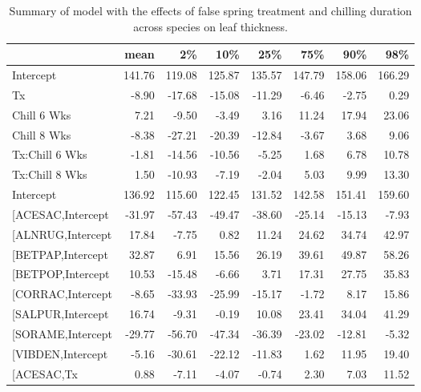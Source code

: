 \documentclass{article}\usepackage[]{graphicx}\usepackage[]{color}
\makeatletter
\newenvironment{kframe}{%
 \def\at@end@of@kframe{}%
 \ifinner\ifhmode%
  \def\at@end@of@kframe{\end{minipage}}%
  \begin{minipage}{\columnwidth}%
 \fi\fi%
 \def\FrameCommand##1{\hskip\@totalleftmargin \hskip-\fboxsep
 \colorbox{shadecolor}{##1}\hskip-\fboxsep
     \hskip-\linewidth \hskip-\@totalleftmargin \hskip\columnwidth}%
 \MakeFramed {\advance\hsize-\width
   \@totalleftmargin\z@ \linewidth\hsize
   \@setminipage}}%
 {\par\unskip\endMakeFramed%
 \at@end@of@kframe}
\makeatother
\begin{document}
\newpage
\begin{kframe}


{\ttfamily\noindent\bfseries\color{errorcolor}{\#\# Error in gsub("{}["{}, "{}"{}, modoutput\$term): invalid regular expression '[', reason 'Missing ']''}}\end{kframe}%
\begin{longtable}{lrrrrrrr}
\caption{Summary of model with the effects of false spring treatment and chilling duration across species on leaf thickness.} \\ 
  \hline
 & mean & 2\% & 10\% & 25\% & 75\% & 90\% & 98\% \\ 
  \hline \endhead  \hline
Intercept & 141.76 & 119.08 & 125.87 & 135.57 & 147.79 & 158.06 & 166.29 \\ 
  Tx & -8.90 & -17.68 & -15.08 & -11.29 & -6.46 & -2.75 & 0.29 \\ 
  Chill 6 Wks & 7.21 & -9.50 & -3.49 & 3.16 & 11.24 & 17.94 & 23.06 \\ 
  Chill 8 Wks & -8.38 & -27.21 & -20.39 & -12.84 & -3.67 & 3.68 & 9.06 \\ 
  Tx:Chill 6 Wks & -1.81 & -14.56 & -10.56 & -5.25 & 1.68 & 6.78 & 10.78 \\ 
  Tx:Chill 8 Wks & 1.50 & -10.93 & -7.19 & -2.04 & 5.03 & 9.99 & 13.30 \\ 
  Intercept & 136.92 & 115.60 & 122.45 & 131.52 & 142.58 & 151.41 & 159.60 \\ 
  [ACESAC,Intercept & -31.97 & -57.43 & -49.47 & -38.60 & -25.14 & -15.13 & -7.93 \\ 
  [ALNRUG,Intercept & 17.84 & -7.75 & 0.82 & 11.24 & 24.62 & 34.74 & 42.97 \\ 
  [BETPAP,Intercept & 32.87 & 6.91 & 15.56 & 26.19 & 39.61 & 49.87 & 58.26 \\ 
  [BETPOP,Intercept & 10.53 & -15.48 & -6.66 & 3.71 & 17.31 & 27.75 & 35.83 \\ 
  [CORRAC,Intercept & -8.65 & -33.93 & -25.99 & -15.17 & -1.72 & 8.17 & 15.86 \\ 
  [SALPUR,Intercept & 16.74 & -9.31 & -0.19 & 10.08 & 23.41 & 34.04 & 41.29 \\ 
  [SORAME,Intercept & -29.77 & -56.70 & -47.34 & -36.39 & -23.02 & -12.81 & -5.32 \\ 
  [VIBDEN,Intercept & -5.16 & -30.61 & -22.12 & -11.83 & 1.62 & 11.95 & 19.40 \\ 
  [ACESAC,Tx & 0.88 & -7.11 & -4.07 & -0.74 & 2.30 & 7.03 & 11.52 \\ 

\end{longtable}
\end{document}
